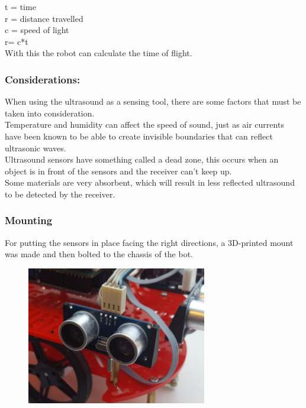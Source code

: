 t = time\\
r = distance travelled\\
c = speed of light\\

r= c*t\\

With this the robot can calculate the time of flight.\

\subsubsection{Considerations:}
When using the ultrasound as a sensing tool, there are some factors that must be taken into consideration.\\ Temperature and humidity can affect the speed of sound, just as air currents have been known to be able to create invisible boundaries that can reflect ultrasonic waves.\\
Ultrasound sensors have something called a dead zone, this occurs when an object is in front of the sensors and the receiver can't keep up.\\
Some materials are very absorbent, which will result in less reflected ultrasound to be detected by the receiver.

\subsubsection{Mounting}

For putting the sensors in place facing the right directions, a 3D-printed mount was made and then bolted to the chassis of the bot. 

\begin{figure}[!ht]
	\centering
	\includegraphics[width=0.7\textwidth]{figures/Mount1.png}
	\caption{}
	\label{Mount}
\end{figure}

